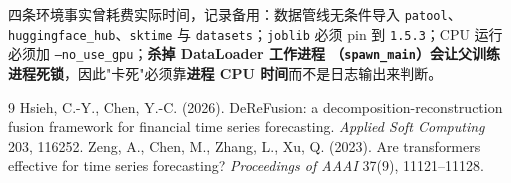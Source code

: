 \documentclass[preprint,12pt]{elsarticle}
\begin{document}
四条环境事实曾耗费实际时间，记录备用：数据管线无条件导入 \texttt{patool}、
\texttt{huggingface\_hub}、\texttt{sktime} 与 \texttt{datasets}；\texttt{joblib} 必须
pin 到 \texttt{1.5.3}；CPU 运行必须加 \texttt{--no\_use\_gpu}；\textbf{杀掉 DataLoader 工作进程
（\texttt{spawn\_main}）会让父训练进程死锁}，因此"卡死"必须靠\textbf{进程 CPU 时间}而不是日志输出来判断。

\begin{thebibliography}{9}
 Hsieh, C.-Y., Chen, Y.-C. (2026). DeReFusion: a decomposition-reconstruction
fusion framework for financial time series forecasting. \emph{Applied Soft Computing} 203, 116252.
 Zeng, A., Chen, M., Zhang, L., Xu, Q. (2023). Are transformers effective for
time series forecasting? \emph{Proceedings of AAAI} 37(9), 11121--11128.
\end{thebibliography}
\end{document}

